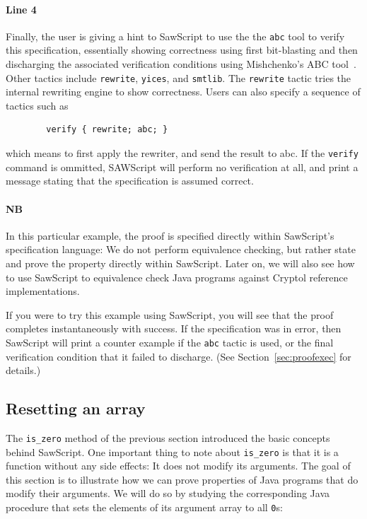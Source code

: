 \documentclass[12pt]{galois-whitepaper}
\newcommand{\sawScript}{{\sc SawScript}\xspace}
\begin{document}
\paragraph{Line 4} Finally, the user is giving a hint to \sawScript to use the the {\tt abc} tool to verify this specification, essentially showing
correctness using first bit-blasting and then discharging the associated verification conditions
using Mishchenko's  ABC tool~\cite{ABC}. Other tactics include {\tt rewrite}, {\tt yices}, and {\tt smtlib}.
The {\tt rewrite} tactic tries the internal rewriting engine to show correctness.
Users can also specify a sequence of tactics such as
\begin{Verbatim}
        verify { rewrite; abc; }
\end{Verbatim}
which means to first apply the rewriter, and send the result to abc.
If the {\tt verify} command is ommitted, SAWScript will perform no verification at all, and print a message stating that the
specification is assumed correct.

\paragraph{NB} In this particular example, the proof is
specified directly within \sawScript's specification language: We do not perform equivalence checking, but rather
state and prove the property directly within \sawScript. Later on, we will also see how to use \sawScript to equivalence check Java programs
against Cryptol reference implementations.

If you were to try this example using \sawScript, you will see that the proof completes instantaneously with success. If the specification was in error, then
\sawScript will print a counter example if the {\tt abc} tactic is used, or the final verification condition that it failed to discharge.
(See Section~\ref{sec:proofexec} for details.)

\subsection{Resetting an array}
The {\tt is\_zero} method of the previous section introduced the basic concepts behind
\sawScript. One important thing to note about {\tt is\_zero} is that it is a function without
any side effects: It does not modify its arguments.
The goal of this
section is to illustrate how we can prove properties of Java programs that do modify their arguments.
We will do so by studying the corresponding Java procedure that sets the elements
of its argument array to all {\tt 0}s:
\end{document}
